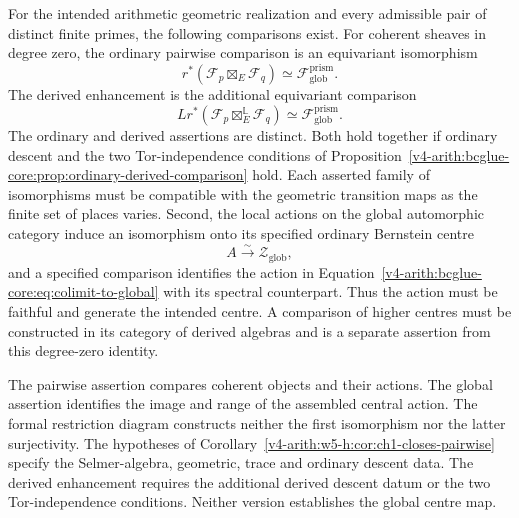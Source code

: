 \begin{conjecture}
\label{v4-arith:bcglue-core:cj:core}
For the intended arithmetic geometric realization and every
admissible pair of distinct finite primes, the following comparisons
exist.
For coherent sheaves in degree zero, the ordinary pairwise
comparison is an equivariant isomorphism
\begin{equation}
\label{v4-arith:bcglue-core:eq:diagonal-is-external}
 r^*(\mathcal F_p\boxtimes_E\mathcal F_q)
       \simeq\mathcal F_{\mathrm{glob}}^{\mathrm{prism}}.
\end{equation}
The derived enhancement is the additional equivariant comparison
\begin{equation}
\label{v4-arith:bcglue-core:eq:derived-diagonal-is-external}
 Lr^*(\mathcal F_p\boxtimes_E^{\mathbb L}\mathcal F_q)
       \simeq\mathcal F_{\mathrm{glob}}^{\mathrm{prism}}.
\end{equation}
The ordinary and derived assertions are distinct.
Both hold together if ordinary descent and the two Tor-independence
conditions of
Proposition~\ref{v4-arith:bcglue-core:prop:ordinary-derived-comparison}
hold. Each asserted family of isomorphisms must be compatible with
the geometric transition maps as the finite set of places varies.
Second, the local actions on the global automorphic category induce
an isomorphism onto its specified ordinary Bernstein centre
\begin{equation}
\label{v4-arith:bcglue-core:eq:colimit-to-global}
 A\xrightarrow{\sim}\mathcal Z_{\mathrm{glob}},
\end{equation}
and a specified comparison identifies the action in
Equation~\eqref{v4-arith:bcglue-core:eq:colimit-to-global}
with its spectral
counterpart. Thus the action must be faithful and generate the
intended centre. A comparison of higher centres must
be constructed in its category of derived algebras and is a
separate assertion from this degree-zero identity.
\end{conjecture}

\begin{remark}
\label{v4-arith:bcglue-core:rem:both-halves}
The pairwise assertion compares coherent objects and their actions.
The global assertion identifies the image and range of the assembled
central action. The formal restriction diagram constructs neither
the first isomorphism nor the latter surjectivity.
The hypotheses of
Corollary~\ref{v4-arith:w5-h:cor:ch1-closes-pairwise} specify the
Selmer-algebra, geometric, trace and ordinary descent data.
The derived enhancement requires the additional derived descent
datum or the two Tor-independence conditions. Neither version
establishes the global centre map.
\end{remark}

